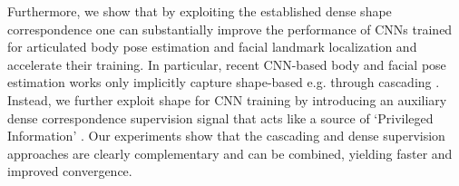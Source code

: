 

Furthermore, we show that by exploiting the established dense shape correspondence one can substantially improve the performance of CNNs trained for articulated body pose estimation and facial landmark localization and accelerate their training. 
In particular, recent CNN-based body and facial pose estimation works  only implicitly capture shape-based e.g. through cascading \citep{newell2016stacked}.  Instead, we further exploit shape for CNN  training by introducing an auxiliary dense correspondence supervision signal that acts like a source  of  `Privileged Information' \citep{VapnikV09,lopez2015unifying,ChenJFY17}.
Our experiments show that the cascading and dense supervision approaches are clearly complementary and can be combined, yielding faster and improved convergence. 




